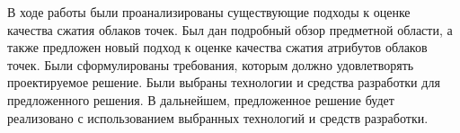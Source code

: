В ходе работы были проанализированы существующие подходы к оценке качества
сжатия облаков точек. Был дан подробный обзор предметной области, а также
предложен новый подход к оценке качества сжатия атрибутов облаков точек. Были
сформулированы требования, которым должно удовлетворять проектируемое решение.
Были выбраны технологии и средства разработки для предложенного решения. В
дальнейшем, предложенное решение будет реализовано с использованием выбранных
технологий и средств разработки.